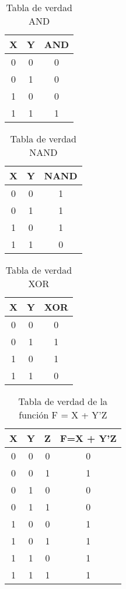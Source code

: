 \documentclass{article}
\begin{document}
\begin{multicols}{2}
\begin{table}[H]
	\centering
	\begin{tabular}{|c|c|c|}
		\hline
		X & Y & AND \\
		\hline
		0 & 0 & 0 \\	
		\hline
		0 & 1 & 0 \\
		\hline
		1 & 0 & 0 \\
	\hline
	1 & 1 & 1 \\
	\hline
\end{tabular}
\caption{Tabla de verdad AND}
\label{table:2}
\end{table}

\begin{table}[H]
	\centering
	\begin{tabular}{|c|c|c|}
		\hline
		X & Y & NAND \\
		\hline
		0 & 0 & 1 \\	
		\hline
		0 & 1 & 1 \\
		\hline
	1 & 0 & 1 \\
	\hline
	1 & 1 & 0 \\
	\hline
\end{tabular}
\caption{Tabla de verdad NAND}
\label{table:3}
\end{table}

\begin{table}[H]
	\centering
	\begin{tabular}{|c|c|c|}
		\hline
		X & Y & XOR \\
		\hline
		0 & 0 & 0 \\	
		\hline
		0 & 1 & 1 \\
		\hline
		1 & 0 & 1 \\
	\hline
	1 & 1 & 0 \\
	\hline
\end{tabular}
\caption{Tabla de verdad XOR}
\label{table:4}
\end{table}

\begin{table}[H]
	\centering
	\begin{tabular}{|c|c|c|c|}
		\hline
		X & Y & Z & F=X + Y'Z \\
		\hline
		0 & 0 & 0 & 0 \\
		0 & 0 & 1 & 1 \\
		0 & 1 & 0 & 0 \\
		0 & 1 & 1 & 0 \\
		1 & 0 & 0 & 1 \\
		1 & 0 & 1 & 1 \\
		1 & 1 & 0 & 1 \\
		1 & 1 & 1 & 1 \\
		\hline
	\end{tabular}
	\caption{Tabla de verdad de la función F = X + Y'Z}
	\label{table:5}
\end{table}

\end{multicols}
\end{document}
